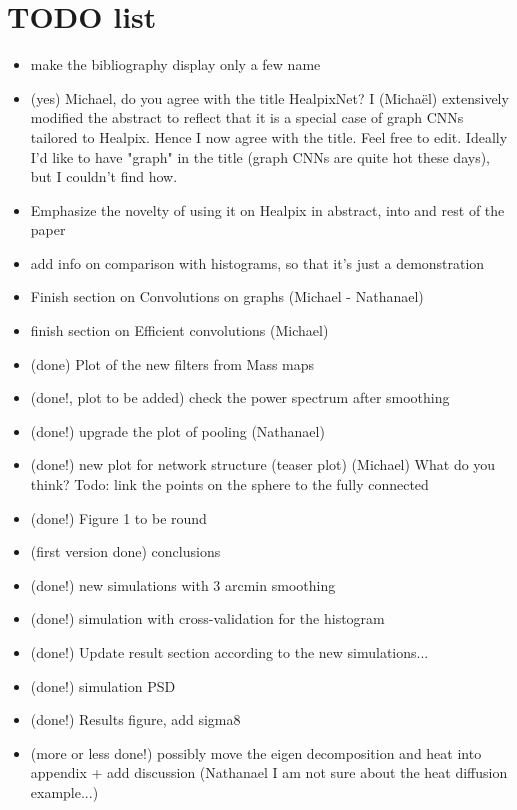 \documentclass[final,twocolumn,3p,times,authoryear]{elsarticle}
\newcommand{\nati}[1]{{\color[rgb]{.1,.6,.1}{#1}}}
\newcommand{\1}{\b{1}}              %
\newcommand{\0}{\b{0}}              %
\begin{document}
\section{TODO list}
\begin{itemize}[noitemsep,topsep=0pt,parsep=0pt,partopsep=0pt]
    \item make the bibliography display only a few name
\item (yes) Michael, do you agree with the title HealpixNet? I (Michaël) extensively modified the abstract to reflect that it is a special case of graph CNNs tailored to Healpix. Hence I now agree with the title. Feel free to edit. Ideally I'd like to have "graph" in the title (graph CNNs are quite hot these days), but I couldn't find how.
    \item Emphasize the novelty of using it on Healpix in abstract, into and rest of the paper
    \item add info on comparison with histograms, so that it's just a demonstration
    \item Finish section on Convolutions on graphs (Michael - Nathanael)
    \item finish section on Efficient convolutions (Michael)
    \item (done) Plot of the new filters from Mass maps
    \item (done!, plot to be added) check the power spectrum after smoothing
    \item (done!) upgrade the plot of pooling (Nathanael)
	\item (done!) new plot for network structure (teaser plot) (Michael) What do you think? Todo: link the points on the sphere to the fully connected \nati{I like the plot, but I am thinking about putting multiple spheres with different maps for the convolutiion instead…}
    \item (done!) Figure 1 to be round
    \item (first version done) conclusions
    \item (done!) new simulations with 3 arcmin smoothing
    \item (done!) simulation with cross-validation for the histogram
    \item (done!) Update result section according to the new simulations...
    \item (done!) simulation PSD
    \item (done!) Results figure, add sigma8
    \item (more or less done!) possibly move the eigen decomposition and heat into appendix + add discussion (Nathanael I am not sure about the heat diffusion example...)
\end{itemize}
\end{document}
